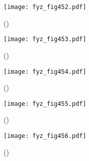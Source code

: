     \begin{figure}[ht!] %
      \centering
      \texttt{[image: fyz\_fig452.pdf]}
      \caption{ 
               (\cite[s.~707]{Feynman01})}
      \label{fyz:fig452}
    \end{figure}
    
    \begin{figure}[ht!] %
      \centering
      \texttt{[image: fyz\_fig453.pdf]}
      \caption{ 
               (\cite[s.~707]{Feynman01})}
      \label{fyz:fig453}
    \end{figure}
    
    \begin{figure}[ht!] %
      \centering
      \texttt{[image: fyz\_fig454.pdf]}
      \caption{ 
               (\cite[s.~707]{Feynman01})}
      \label{fyz:fig454}
    \end{figure}
    
    \begin{figure}[ht!] %
      \centering
      \texttt{[image: fyz\_fig455.pdf]}
      \caption{ 
               (\cite[s.~707]{Feynman01})}
      \label{fyz:fig455}
    \end{figure}
    
    \begin{figure}[ht!] %
      \centering
      \texttt{[image: fyz\_fig456.pdf]}
      \caption{ 
               (\cite[s.~707]{Feynman01})}
      \label{fyz:fig456}
    \end{figure}

